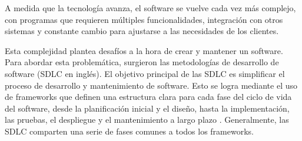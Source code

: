 \par A medida que la tecnología avanza, el software se vuelve cada vez más complejo, con programas que requieren múltiples funcionalidades, integración con otros sistemas y constante cambio para ajustarse a las necesidades de los clientes.
\par Esta complejidad plantea desafíos a la hora de crear y mantener un software. Para abordar esta problemática, surgieron las metodologías de desarrollo de software (SDLC en inglés). El objetivo principal de las SDLC es simplificar el proceso de desarrollo y mantenimiento de software. Esto se logra mediante el uso de frameworks que definen una estructura clara para cada fase del ciclo de vida del software, desde la planificación inicial y el diseño, hasta la implementación, las pruebas, el despliegue y el mantenimiento a largo plazo \cite{sStudySoftwareDevelopment2017,rupareliaSoftwareDevelopmentLifecycle2010}. Generalmente, las SDLC comparten una serie de fases comunes a todos los frameworks.

